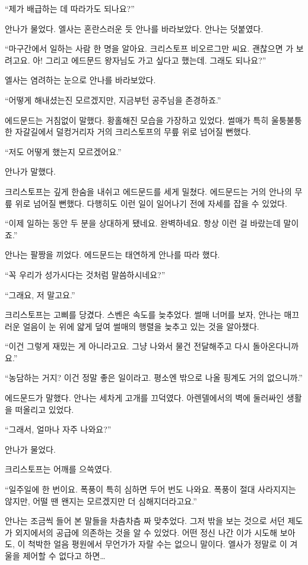 ``제가 배급하는 데 따라가도 되나요?''

안나가 물었다. 엘사는 혼란스러운 듯 안나를 바라보았다. 안나는 덧붙였다.

``마구간에서 일하는 사람 한 명을 알아요. 크리스토프 비오르그만 씨요. 괜찮으면 가 보려고요. 아! 그리고 에드문드 왕자님도 가고 싶다고 했는데. 그래도 되나요?''

엘사는 염려하는 눈으로 안나를 바라보았다.

\textbreak

\forceindent``어떻게 해내셨는진 모르겠지만, 지금부턴 공주님을 존경하죠.''

에드문드는 거침없이 말했다. 황홀해진 모습을 가장하고 있었다. 썰매가 특히 울퉁불퉁한 자갈길에서 덜컹거리자 거의 크리스토프의 무릎 위로 넘어질 뻔했다. 

``저도 어떻게 했는지 모르겠어요.''

안나가 말했다.

크리스토프는 깊게 한숨을 내쉬고 에드문드를 세게 밀쳤다. 에드문드는 거의 안나의 무릎 위로 넘어질 뻔했다. 다행히도 이런 일이 일어나기 전에 자세를 잡을 수 있었다.

``이제 일하는 동안 두 분을 상대하게 됐네요. 완벽하네요. 항상 이런 걸 바랐는데 말이죠.''

안나는 팔짱을 끼었다. 에드문드는 태연하게 안나를 따라 했다.

``꼭 우리가 성가시다는 것처럼 말씀하시네요?''

``그래요, 저 말고요.''

크리스토프는 고삐를 당겼다. 스벤은 속도를 늦추었다. 썰매 너머를 보자, 안나는 매끄러운 얼음이 눈 위에 얇게 덮여 썰매의 행렬을 늦추고 있는 것을 알아챘다.

``이건 그렇게 재밌는 게 아니라고요. 그냥 나와서 물건 전달해주고 다시 돌아온다니까요.''

``농담하는 거지? 이건 정말 좋은 일이라고. 평소엔 밖으로 나올 핑계도 거의 없으니까.''

에드문드가 말했다. 안나는 세차게 고개를 끄덕였다. 아렌델에서의 벽에 둘러싸인 생활을 떠올리고 있었다.

``그래서, 얼마나 자주 나와요?''

안나가 물었다.

크리스토프는 어깨를 으쓱였다.

``일주일에 한 번이요. 폭풍이 특히 심하면 두어 번도 나와요. 폭풍이 절대 사라지지는 않지만, 어떨 땐 왠지는 모르겠지만 더 심해지더라고요.''

안나는 조금씩 들어 본 말들을 차츰차츰 짜 맞추었다. 그저 밖을 보는 것으로 서던 제도가 외지에서의 공급에 의존하는 것을 알 수 있었다. 어떤 정신 나간 이가 시도해 보아도, 이 척박한 얼음 평원에서 무언가가 자랄 수는 없으니 말이다. 엘사가 정말로 이 겨울을 제어할 수 없다고 하면\ldots

